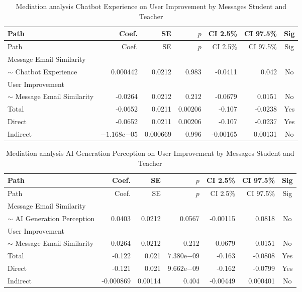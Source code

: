 \begin{longtable}{lrrrrrc}
            \caption{Mediation analysis Chatbot Experience on User Improvement by  Messages Student and Teacher}\label{tab:mediation Chatbot Experience on User Improvement by  Messages Student and Teacher}\\
            \toprule
            Path & Coef. & SE & $p$ & CI 2.5\% & CI 97.5\% & Sig \\
            \midrule
            \endfirsthead
            \toprule
            Path & Coef. & SE & $p$ & CI 2.5\% & CI 97.5\% & Sig \\
            \midrule
            \endhead
            \bottomrule
            \endfoot
            Message Email Similarity\\ $\sim$ Chatbot Experience & 0.000442 & 0.0212 & 0.983 & -0.0411 & 0.042 & No \\
User Improvement\\ $\sim$ Message Email Similarity & -0.0264 & 0.0212 & 0.212 & -0.0679 & 0.0151 & No \\
Total & -0.0652 & 0.0211 & 0.00206 & -0.107 & -0.0238 & Yes \\
Direct & -0.0652 & 0.0211 & 0.00206 & -0.107 & -0.0237 & Yes \\
Indirect & $-1.168\mathrm{e}{-05}$ & 0.000669 & 0.996 & -0.00165 & 0.00131 & No \\
\end{longtable}

\begin{longtable}{lrrrrrc}
            \caption{Mediation analysis AI Generation Perception on User Improvement by  Messages Student and Teacher}\label{tab:mediation AI Generation Perception on User Improvement by  Messages Student and Teacher}\\
            \toprule
            Path & Coef. & SE & $p$ & CI 2.5\% & CI 97.5\% & Sig \\
            \midrule
            \endfirsthead
            \toprule
            Path & Coef. & SE & $p$ & CI 2.5\% & CI 97.5\% & Sig \\
            \midrule
            \endhead
            \bottomrule
            \endfoot
            Message Email Similarity\\ $\sim$ AI Generation Perception & 0.0403 & 0.0212 & 0.0567 & -0.00115 & 0.0818 & No \\
User Improvement\\ $\sim$ Message Email Similarity & -0.0264 & 0.0212 & 0.212 & -0.0679 & 0.0151 & No \\
Total & -0.122 & 0.021 & $7.380\mathrm{e}{-09}$ & -0.163 & -0.0808 & Yes \\
Direct & -0.121 & 0.021 & $9.662\mathrm{e}{-09}$ & -0.162 & -0.0799 & Yes \\
Indirect & -0.000869 & 0.00114 & 0.404 & -0.00449 & 0.000401 & No \\
\end{longtable}

